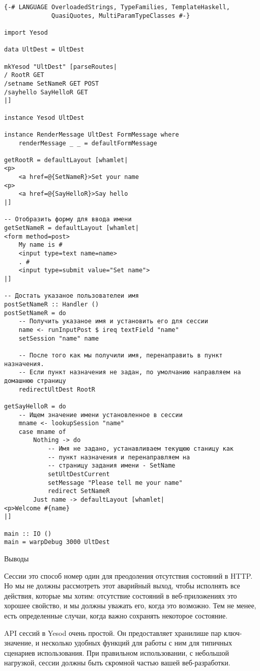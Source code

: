 \begin{lstlisting}
{-# LANGUAGE OverloadedStrings, TypeFamilies, TemplateHaskell,
             QuasiQuotes, MultiParamTypeClasses #-}

import Yesod

data UltDest = UltDest

mkYesod "UltDest" [parseRoutes|
/ RootR GET
/setname SetNameR GET POST
/sayhello SayHelloR GET
|]

instance Yesod UltDest

instance RenderMessage UltDest FormMessage where
    renderMessage _ _ = defaultFormMessage

getRootR = defaultLayout [whamlet|
<p>
    <a href=@{SetNameR}>Set your name
<p>
    <a href=@{SayHelloR}>Say hello
|]

-- Отобразить форму для ввода имени
getSetNameR = defaultLayout [whamlet|
<form method=post>
    My name is #
    <input type=text name=name>
    . #
    <input type=submit value="Set name">
|]

-- Достать указаное пользователеи имя
postSetNameR :: Handler ()
postSetNameR = do
    -- Получить указаное имя и установить его для сессии
    name <- runInputPost $ ireq textField "name"
    setSession "name" name

    -- После того как мы получили имя, перенаправить в пункт назначения.
    -- Если пункт назначения не задан, по умолчанию направляем на домашнюю страницу
    redirectUltDest RootR

getSayHelloR = do
    -- Ищем значение имени установленное в сессии
    mname <- lookupSession "name"
    case mname of
        Nothing -> do
            -- Имя не задано, устанавливаем текущюю станицу как
            -- пункт назначения и перенаправляем на
            -- страницу задания имени - SetName 
            setUltDestCurrent
            setMessage "Please tell me your name"
            redirect SetNameR
        Just name -> defaultLayout [whamlet|
<p>Welcome #{name}
|]

main :: IO ()
main = warpDebug 3000 UltDest
\end{lstlisting}

Выводы

Сессии это способ номер один для преодоления отсутствия состояний в HTTP. Но мы не должны рассмотреть этот аварийный выход, чтобы исполнять все действия, которые мы хотим: отсутствие состояний в веб-приложениях это хорошее свойство, и мы должны уважать его, когда это возможно. Тем не менее, есть определенные случаи, когда важно сохранять некоторое состояние. 

API сессий в Yesod очень простой. Он предоставляет хранилише пар ключ-значение, и несколько удобных функций для работы с ним для типичных сценариев использования. При правильном использовании, с небольшой нагрузкой, сессии должны быть скромной частью вашей веб-разработки. 
